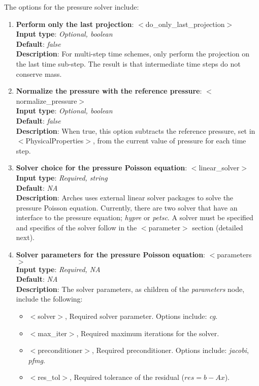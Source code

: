 The options for the pressure solver include:
%
\begin{enumerate}
%
\item {\bf Perform only the last projection}: $<$do\_only\_last\_projection$>$ \\
{\bf Input type}: {\it Optional, boolean} \\
{\bf Default}: {\it false } \\ 
{\bf Description}: For multi-step time schemes, only perform the projection on the last time sub-step. The result is that intermediate time steps do not conserve mass. 
%
\item {\bf Normalize the pressure with the reference pressure}: $<$normalize\_pressure$>$ \\
{\bf Input type}: {\it Optional, boolean} \\
{\bf Default}: {\it false } \\ 
{\bf Description}: When true, this option subtracts the reference pressure, set in $<$PhysicalProperties$>$, from the current value of pressure for each time step.  
%
\item {\bf Solver choice for the pressure Poisson equation}: $<$linear\_solver$>$ \\
{\bf Input type}: {\it Required, string} \\
{\bf Default}: {\it NA } \\ 
{\bf Description}: Arches uses external linear solver packages to solve the pressure Poisson equation.  Currently, there are two solver that have an interface to the pressure equation; {\it hypre} or {\it petsc}.  A solver must be specified and specifics of the solver follow in the $<$parameter$>$ section (detailed next).     
%
\item {\bf Solver parameters for the pressure Poisson equation}: $<$parameters$>$ \\
{\bf Input type}: {\it Required, NA} \\
{\bf Default}: {\it NA } \\ 
{\bf Description}: The solver parameters, as children of the {\it parameters} node, include the following:
 \begin{itemize}
 \item $<$solver$>$, Required solver parameter.  Options include: {\it cg}.  
 \item $<$max\_iter$>$, Required maximum iterations for the solver.
 \item $<$preconditioner$>$, Required preconditioner.  Options include: {\it jacobi}, {\it pfmg}. 
 \item $<$res\_tol$>$, Required tolerance of the residual ($res = b-Ax$).
\end{itemize}  
%
\end{enumerate}   
%

